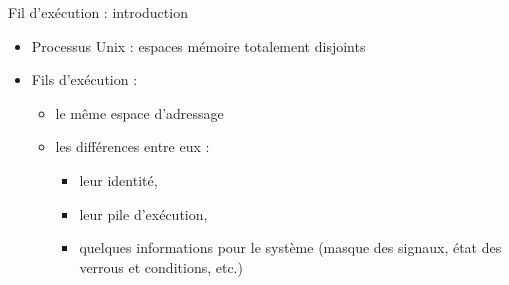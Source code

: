 \begin{frame}{Fil d'exécution : introduction }
    \begin{itemize}
        \item Processus Unix : espaces mémoire totalement disjoints
        \item Fils d'exécution : 
        \begin{itemize}[label=\small{}]
            \item le même espace d'adressage
            \item les différences entre eux : 
            \begin{itemize}[label=]
                \item leur identité,
                \item leur pile d’exécution,
                \item quelques informations pour le système (masque des signaux, état des verrous et conditions, etc.)
            \end{itemize} 
        \end{itemize}
    \end{itemize}
\end{frame}

